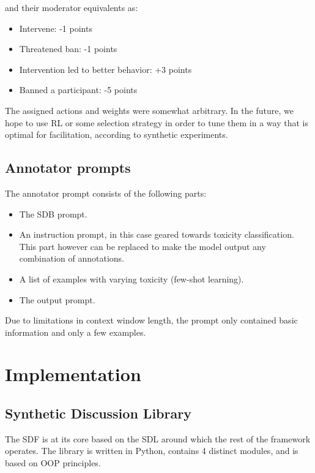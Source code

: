 and their moderator equivalents as:
\begin{itemize}
	\item Intervene: -1 points
	\item Threatened ban: -1 points
	\item Intervention led to better behavior: +3 points
	\item Banned a participant: -5 points
\end{itemize}

The assigned actions and weights were somewhat arbitrary. In the future, we hope to use \ac{RL} or some selection strategy in order to tune them in a way that is optimal for facilitation, according to synthetic experiments.

\subsection{Annotator prompts}
\label{ssec:system:annotator-prompt}

The annotator prompt consists of the following parts:

\begin{itemize}
	\item The \ac{SDB} prompt.
	
	\item An instruction prompt, in this case geared towards toxicity classification. This part however can be replaced to make the model output any combination of annotations.
	
	\item A list of examples with varying toxicity (few-shot learning).
	
	\item The output prompt.
\end{itemize}

Due to limitations in context window length, the prompt only contained basic information and only a few examples.

\section{Implementation}
\label{sec:system:implementation}

\subsection{Synthetic Discussion Library}
\label{ssec:system:library}

The \ac{SDF} is at its core based on the \ac{SDL} around which the rest of the framework operates. The library is written in Python, contains 4 distinct modules, and is based on \ac{OOP} principles.

